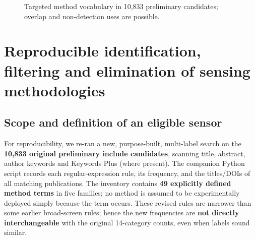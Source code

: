 \documentclass[10pt,a4paper]{article}
\begin{document}
\begin{figure}[H]\centering
{}
\caption{Targeted method vocabulary in 10,833 preliminary candidates; overlap and non-detection uses are possible.}\label{fig:targeted}
\end{figure}


\section{Reproducible identification, filtering and elimination of sensing methodologies}
\label{sec:formal_selection}
\subsection{Scope and definition of an eligible sensor}
For reproducibility, we re-ran a new, purpose-built, multi-label search on the \textbf{10,833 original preliminary include candidates}, scanning title, abstract, author keywords and Keywords Plus (where present). The companion Python script records each regular-expression rule, its frequency, and the titles/DOIs of all matching publications. The inventory contains \textbf{49 explicitly defined method terms} in five families; no method is assumed to be experimentally deployed simply because the term occurs. These revised rules are narrower than some earlier broad-screen rules; hence the new frequencies are \textbf{not directly interchangeable} with the original 14-category counts, even when labels sound similar.
\end{document}
